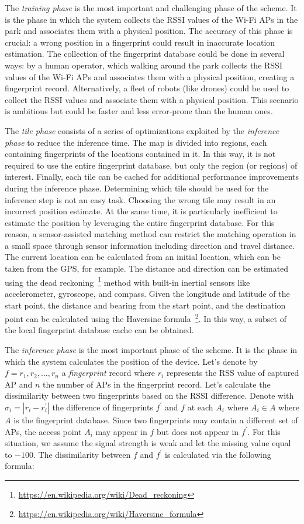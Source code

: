 The \textit{training phase} is the most important and challenging phase of the scheme. It is the phase in which the system collects the RSSI values
of the Wi-Fi APs in the park and associates them with a physical position. The accuracy of this phase is crucial: a wrong position in a fingerprint
could result in inaccurate location estimation. The collection of the fingerprint database could be done in several ways: by a human operator, which
walking around the park collects the RSSI values of the Wi-Fi APs and associates them with a physical position, creating a fingerprint record.
Alternatively, a fleet of robots (like drones) could be used to collect the RSSI values and associate them with a physical position. This scenario is
ambitious but could be faster and less error-prone than the human ones.

The \textit{tile phase} consists of a series of optimizations exploited by the \textit{inference phase} to reduce the inference time. The map is
divided into regions, each containing fingerprints of the locations contained in it. In this way, it is not required to use the entire fingerprint
database, but only the region (or regions) of interest. Finally, each tile can be cached for additional performance improvements during the inference
phase. Determining which tile should be used for the inference step is not an easy task. Choosing the wrong tile may result in an incorrect position
estimate. At the same time, it is particularly inefficient to estimate the position by leveraging the entire fingerprint database. For this reason, a
sensor-assisted matching method can restrict the matching operation in a small space through sensor information including direction and travel
distance. The current location can be calculated from an initial location, which can be taken from the GPS, for example. The distance and direction
can be estimated using the dead reckoning~\footnote{\url{https://en.wikipedia.org/wiki/Dead_reckoning}} method with built-in inertial sensors like
accelerometer, gyroscope, and compass. Given the longitude and latitude of the start point, the distance and bearing from the start point, and the
destination point can be calculated using the Haversine formula~\footnote{\url{https://en.wikipedia.org/wiki/Haversine_formula}}. In this way, a
subset of the local fingerprint database cache can be obtained.

The \textit{inference phase} is the most important phase of the scheme. It is the phase in which the system calculates the position of the device.
Let's denote by $f = {r_1, r_2, \ldots, r_n}$ a \textit{fingerprint} record where $r_i$ represents the RSS value of captured AP and $n$ the number of
APs in the fingerprint record. Let's calculate the dissimilarity between two fingerprints based on the RSSI difference. Denote with $\sigma_i = | r_i
	- r^{'}_{i}|$ the difference of fingerprints $f^{'}$ and $f$ at each $A_i$ where $A_i \in A$ where $A$ is the fingerprint database. Since two
fingerprints may contain a different set of APs, the access point $A_i$ may appear in $f$ but does not appear in $f^{'}$. For this situation, we
assume the signal strength is weak and let the missing value equal to $-100$. The dissimilarity between $f$ and $f^{'}$ is calculated via the
following formula:

